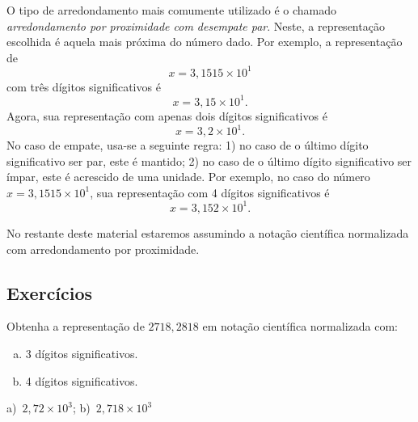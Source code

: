 O tipo de arredondamento mais comumente utilizado é o chamado \emph{arredondamento por proximidade com desempate par}. Neste, a representação escolhida é aquela mais próxima do número dado. Por exemplo, a representação de 
\begin{equation}
  x=3,1515\times 10^1
\end{equation}
 com três dígitos significativos é 
 \begin{equation}
   x=3,15\times 10^{1}. 
\end{equation}
Agora, sua representação com apenas dois dígitos significativos é
\begin{equation}
  x=3,2\times 10^{1}.
\end{equation}
No caso de empate, usa-se a seguinte regra: 1) no caso de o último dígito significativo ser par, este é mantido; 2) no caso de o último dígito significativo ser ímpar, este é acrescido de uma unidade. Por exemplo, no caso do número $x=3,1515\times 10^1$, sua representação com 4 dígitos significativos é
\begin{equation}
  x = 3,152\times 10^1.
\end{equation}


No restante deste material estaremos assumindo a notação científica normalizada com arredondamento por proximidade.

\subsection*{Exercícios}

\begin{exer}
  Obtenha a representação de $2718,2818$ em notação científica normalizada com:
  \begin{enumerate}[a)]
  \item 3 dígitos significativos.
  \item 4 dígitos significativos.
  \end{enumerate}
\end{exer}
\begin{resp}
  a)~$2,72\times 10^3$; b)~$2,718\times 10^3$
\end{resp}

